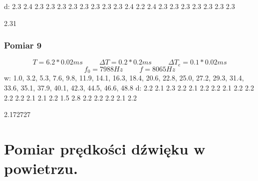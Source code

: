 \documentclass[12pt,a4paper]{article}
\begin{document}
d: 2.3 2.4 2.3 2.3 2.3 2.3 2.3 2.3 2.3 2.3 2.4 2.2 2.4 2.3 2.3 2.3 2.3 2.3 2.3 2.3

2.31
\subsubsection{Pomiar 9}
$$
T = 6.2*0.02ms \hspace{1cm} \Delta T = 0.2*0.2ms \hspace{1cm} \Delta T_e = 0.1*0.02ms 
$$
$$
f_0 = 7988Hz \hspace{1cm} f=8065Hz
$$
w: 1.0, 3.2, 5.3, 7.6, 9.8, 11.9, 14.1, 16.3, 18.4, 20.6, 22.8, 25.0, 27.2, 29.3, 31.4, 33.6, 35.1, 37.9, 40.1, 42.3, 44.5, 46.6, 48.8
d: 2.2 2.1 2.3 2.2 2.1 2.2 2.2 2.1 2.2 2.2 2.2 2.2 2.1 2.1 2.2 1.5 2.8 2.2 2.2 2.2 2.1 2.2


2.172727
\section{Pomiar prędkości dźwięku w powietrzu.}
\end{document}
